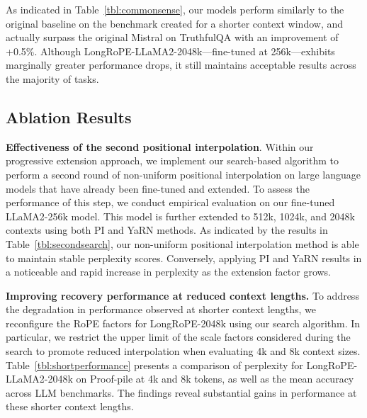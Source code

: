 As indicated in Table~\ref{tbl:commonsense}, our models perform similarly to the original baseline on the benchmark created for a shorter context window, and actually surpass the original Mistral on TruthfulQA with an improvement of +0.5\%. Although LongRoPE-LLaMA2-2048k—fine-tuned at 256k—exhibits marginally greater performance drops, it still maintains acceptable results across the majority of tasks.

\subsection{Ablation Results}

\textbf{Effectiveness of the second positional interpolation}. Within our progressive extension approach, we implement our search-based algorithm to perform a second round of non-uniform positional interpolation on large language models that have already been fine-tuned and extended. To assess the performance of this step, we conduct empirical evaluation on our fine-tuned LLaMA2-256k model. This model is further extended to 512k, 1024k, and 2048k contexts using both PI and YaRN methods. As indicated by the results in Table~\ref{tbl:secondsearch}, our non-uniform positional interpolation method is able to maintain stable perplexity scores. Conversely, applying PI and YaRN results in a noticeable and rapid increase in perplexity as the extension factor grows.

\textbf{Improving recovery performance at reduced context lengths.} To address the degradation in performance observed at shorter context lengths, we reconfigure the RoPE factors for LongRoPE-2048k using our search algorithm. In particular, we restrict the upper limit of the scale factors considered during the search to promote reduced interpolation when evaluating 4k and 8k context sizes. Table~\ref{tbl:shortperformance} presents a comparison of perplexity for LongRoPE-LLaMA2-2048k on Proof-pile at 4k and 8k tokens, as well as the mean accuracy across LLM benchmarks. The findings reveal substantial gains in performance at these shorter context lengths.

